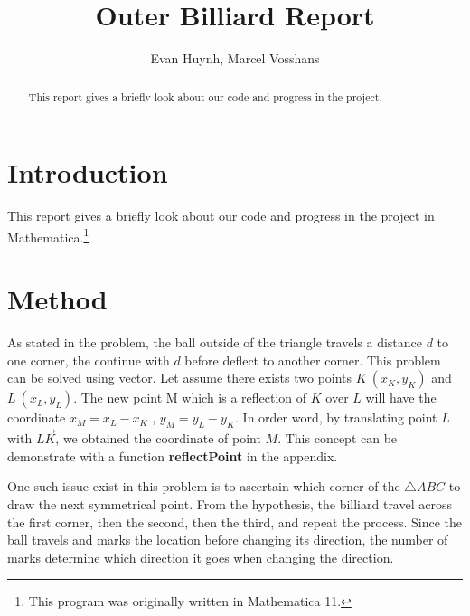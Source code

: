\documentclass[a4paper,11pt]{article}
\begin{document}
\title{Outer Billiard Report}
\author{Evan Huynh, Marcel Vosshans}
\maketitle

\begin{abstract}
	This report gives a briefly look about our code and progress in the  project.
\end{abstract}

\tableofcontents
\listoffigures
  
\section{Introduction}
This report gives a briefly look about our code and progress in the  project in Mathematica.\footnote{This program was originally written in Mathematica 11.}

\section{Method}

As stated in the problem, the ball outside of the triangle travels a distance \(d\) to one corner, the continue with \(d\) before deflect to another corner. This problem can be solved using vector. Let assume there exists two points \(K \ (x_K, y_K)\) and \(L\ (x_L, y_L)\). The new point M which is a reflection of \(K\) over \(L\) will have the coordinate \(x_M = x_L - x_K\) , \( y_M = y_L - y_K\). In order word, by translating point \(L\) with \(\overrightarrow{LK}\), we obtained the coordinate of point \(M\). This concept can be demonstrate with a function \textbf{reflectPoint} in the appendix.

One such issue exist in this problem is to ascertain which corner of the \(\triangle ABC\) to draw the next symmetrical point. From the hypothesis, the billiard travel across the first corner, then the second, then the third, and repeat the process. Since the ball travels and marks the location before changing its direction, the number of marks determine which direction it goes when changing the direction.
\end{document}
